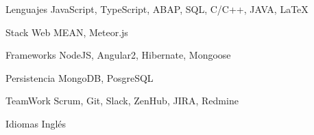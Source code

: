 


\begin{cvskills}


\cvskill
{Lenguajes} %
{JavaScript, TypeScript, ABAP, SQL, C/C++, JAVA, \LaTeX{} } %


\cvskill
{Stack Web} %
{MEAN, Meteor.js} %

\cvskill
{Frameworks} %
{NodeJS, Angular2, Hibernate, Mongoose} %


\cvskill
{Persistencia} %
{MongoDB, PosgreSQL} %

\cvskill
{TeamWork} %
{Scrum, Git, Slack, ZenHub, JIRA, Redmine} %

\cvskill
{Idiomas} %
{Inglés} %


\end{cvskills}

